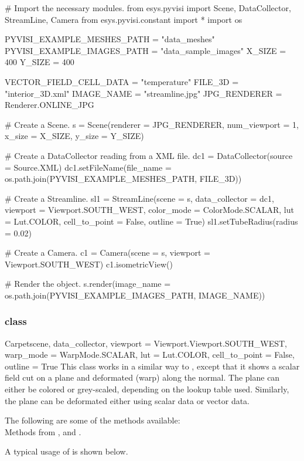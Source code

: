 \begin{python}
# Import the necessary modules.
from esys.pyvisi import Scene, DataCollector, StreamLine, Camera 
from esys.pyvisi.constant import *
import os

PYVISI_EXAMPLE_MESHES_PATH = "data_meshes"
PYVISI_EXAMPLE_IMAGES_PATH = "data_sample_images"
X_SIZE = 400
Y_SIZE = 400

VECTOR_FIELD_CELL_DATA = "temperature"
FILE_3D = "interior_3D.xml"
IMAGE_NAME = "streamline.jpg"
JPG_RENDERER = Renderer.ONLINE_JPG

# Create a Scene.
s = Scene(renderer = JPG_RENDERER, num_viewport = 1, x_size = X_SIZE, 
        y_size = Y_SIZE)

# Create a DataCollector reading from a XML file.
dc1 = DataCollector(source = Source.XML)
dc1.setFileName(file_name = os.path.join(PYVISI_EXAMPLE_MESHES_PATH, FILE_3D))

# Create a Streamline.
sl1 = StreamLine(scene = s, data_collector = dc1,
        viewport = Viewport.SOUTH_WEST, color_mode = ColorMode.SCALAR, 
        lut = Lut.COLOR, cell_to_point = False, outline = True)
sl1.setTubeRadius(radius = 0.02)

# Create a Camera.
c1 = Camera(scene = s, viewport = Viewport.SOUTH_WEST)
c1.isometricView()

# Render the object.
s.render(image_name = os.path.join(PYVISI_EXAMPLE_IMAGES_PATH, IMAGE_NAME))
\end{python}

\subsubsection{\Carpet class}

\begin{classdesc}{Carpet}{scene, data_collector,
viewport = Viewport.Viewport.SOUTH_WEST, warp_mode = WarpMode.SCALAR, 
lut = Lut.COLOR, cell_to_point = False, outline = True}
This class works in a similar way to \MapOnPlaneCut, except that it shows a 
scalar field cut on a plane and deformated (warp) along the normal. The 
plane can either be colored or grey-scaled, depending on the lookup table used. 
Similarly, the plane can be deformated either using scalar data or vector data.
\end{classdesc}

The following are some of the methods available:\\
Methods from \ActorThreeD, \Warp and \Transform.

A typical usage of \Carpet is shown below.

